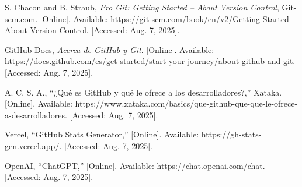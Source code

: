 \documentclass[conference]{IEEEtran}
\begin{document}
\begin{thebibliography}{00}

 S. Chacon and B. Straub, \emph{Pro Git: Getting Started – About Version Control}, Git-scm.com. [Online]. Available: https://git-scm.com/book/en/v2/Getting-Started-About-Version-Control. [Accessed: Aug. 7, 2025].

 GitHub Docs, \emph{Acerca de GitHub y Git}. [Online]. Available: https://docs.github.com/es/get-started/start-your-journey/about-github-and-git. [Accessed: Aug. 7, 2025].

 A. C. S. A., ``¿Qué es GitHub y qué le ofrece a los desarrolladores?,'' Xataka. [Online]. Available: https://www.xataka.com/basics/que-github-que-que-le-ofrece-a-desarrolladores. [Accessed: Aug. 7, 2025].

 Vercel, ``GitHub Stats Generator,'' [Online]. Available: https://gh-stats-gen.vercel.app/. [Accessed: Aug. 7, 2025].

 OpenAI, ``ChatGPT,'' [Online]. Available: https://chat.openai.com/chat. [Accessed: Aug. 7, 2025].


\end{thebibliography}
\end{document}

